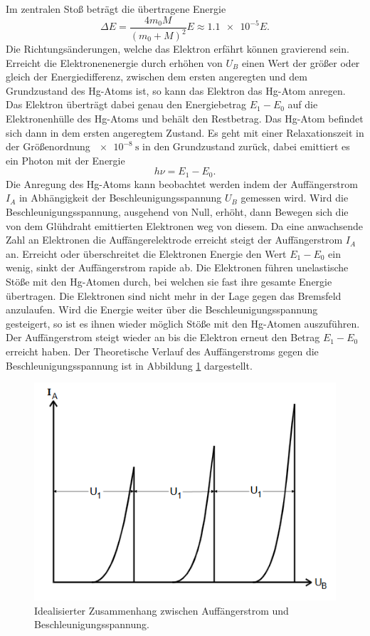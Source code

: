 Im zentralen Stoß beträgt die übertragene Energie
\begin{equation}
  \label{eq:betrag}
  \Delta E = \frac{4 m_0 M}{(m_0 + M)^2} E \approx \num{1.1e-5} E  .
\end{equation}
Die Richtungsänderungen, welche das Elektron erfährt können gravierend sein.
Erreicht die Elektronenenergie durch erhöhen von $U_B$ einen Wert der größer oder gleich der Energiedifferenz, zwischen dem ersten angeregten und dem Grundzustand des Hg-Atoms ist, so kann das Elektron das Hg-Atom anregen.
Das Elektron überträgt dabei genau den Energiebetrag $E_1 - E_0$ auf die Elektronenhülle des Hg-Atoms und behält den Restbetrag.
Das Hg-Atom befindet sich dann in dem ersten angeregtem Zustand.
Es geht mit einer Relaxationszeit in der Größenordnung $\SI{e-8}{\second}$ in den Grundzustand zurück, dabei emittiert es ein Photon mit der Energie
\begin{equation}
  \label{eq:phot}
  h\nu = E_1 -E_0    .
\end{equation}
Die Anregung des Hg-Atoms kann beobachtet werden indem der Auffängerstrom $I_A$ in Abhängigkeit der Beschleunigungsspannung $U_B$ gemessen wird.
Wird die Beschleunigungsspannung, ausgehend von Null, erhöht, dann Bewegen sich die von dem Glühdraht emittierten Elektronen weg von diesem.
Da eine anwachsende Zahl an Elektronen die Auffängerelektrode erreicht steigt der Auffängerstrom $I_A$ an.
Erreicht oder überschreitet die Elektronen Energie den Wert $E_1-E_0$ ein wenig, sinkt der Auffängerstrom rapide ab.
Die Elektronen führen unelastische Stöße mit den Hg-Atomen durch, bei welchen sie fast ihre gesamte Energie übertragen.
Die Elektronen sind nicht mehr in der Lage gegen das Bremsfeld anzulaufen.
Wird die Energie weiter über die Beschleunigungsspannung gesteigert, so ist es ihnen wieder möglich Stöße mit den Hg-Atomen auszuführen.
Der Auffängerstrom steigt wieder an bis die Elektron erneut den Betrag $E_1-E_0$ erreicht haben.
Der Theoretische Verlauf des Auffängerstroms gegen die Beschleunigungsspannung ist in Abbildung \ref{fig:besch} dargestellt.
\begin{figure}[H]
  \centering
  \includegraphics[width=\textwidth]{content/theoriekurve.png}
  \caption{Idealisierter Zusammenhang zwischen Auffängerstrom und Beschleunigungsspannung.}
  \label{fig:besch}
\end{figure}

